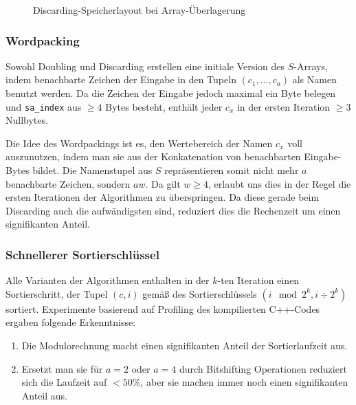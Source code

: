 \begin{figure}
\caption{Discarding-Speicherlayout bei Array-Überlagerung}
\label{fig:doubling:opt:discardlagerung}
\end{figure}

\subsubsection{Wordpacking}

Sowohl Doubling und Discarding erstellen eine initiale Version des $S$-Arrays, indem benachbarte Zeichen der Eingabe in den Tupeln $(c_1, \dots, c_a)$ als Namen benutzt werden. Da die Zeichen der Eingabe jedoch maximal ein Byte belegen und \texttt{sa\_index} aus $\ge 4$ Bytes besteht, enthält jeder $c_x$ in der ersten Iteration $\ge 3$ Nullbytes.

Die Idee des Wordpackings ist es, den Wertebereich der Namen $c_x$ voll auszunutzen, indem man sie aus der Konkatenation von benachbarten Eingabe-Bytes bildet. Die Namenstupel aus $S$ repräsentieren somit nicht mehr $a$ benachbarte Zeichen, sondern $aw$. Da gilt $w \ge 4$, erlaubt uns dies in der Regel die ersten Iterationen der Algorithmen zu überspringen. Da diese gerade beim Discarding auch die aufwändigsten sind, reduziert dies die Rechenzeit um einen signifikanten Anteil.

\subsubsection{Schnellerer Sortierschlüssel}

Alle Varianten der Algorithmen enthalten in der $k$-ten Iteration einen Sortierschritt, der Tupel $(c, i)$ gemäß des Sortierschlüssels $(i \mod 2^k, i \div 2^k)$ sortiert. Experimente basierend auf Profiling des kompilierten C++-Codes ergaben folgende Erkenntnisse:

\begin{enumerate}
\item Die Modulorechnung macht einen signifikanten Anteil der Sortierlaufzeit aus.
\item Ersetzt man sie für $a = 2$ oder $a = 4$ durch Bitshifting Operationen reduziert sich die Laufzeit auf $< 50\%$, aber sie machen immer noch einen signifikanten Anteil aus.
\end{enumerate}

